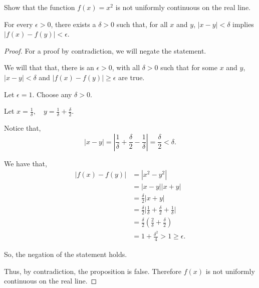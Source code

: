 \documentclass[../hw5.tex]{subfiles}
\begin{document}
Show that the function $f(x)=x^2$ is not uniformly continuous on the real line.

\begin{proposition}
    For every $\epsilon>0$, there exists a $\delta>0$ such that, for all $x$ and $y$, $|x-y|<\delta$ implies $|f(x)-f(y)|<\epsilon$.
\end{proposition}

\begin{proof}
    For a proof by contradiction, we will negate the statement. 

    We will that that, there is an $\epsilon>0$, with all $\delta>0$ such that for some $x$ and $y$, $|x-y|<\delta$ and $|f(x)-f(y)|\geq\epsilon$ are true.

    Let $\epsilon=1$. Choose any $\delta>0$.

    Let $x=\frac{1}{\delta}, \quad y=\frac{1}{\delta}+\frac{\delta}{2}$.

    Notice that,
    \[|x-y|=|\frac{1}{\delta}+\frac{\delta}{2} - \frac{1}{\delta}| = \frac{\delta}{2} < \delta.\]


    We have that,
    \begin{align*}
        |f(x)-f(y)| &= |x^2-y^2| \\
        &= |x-y||x+y| \\
        &= \frac{\delta}{2}|x+y| \\
        &= \frac{\delta}{2}\Bigg| \frac{1}{\delta}+\frac{\delta}{2} + \frac{1}{\delta}\Bigg| \\
        &= \frac{\delta}{2} \left( \frac{2}{\delta}+\frac{\delta}{2} \right) \\
        &= 1 + \frac{\delta^2}{4} > 1\geq\epsilon.
    \end{align*}

    So, the negation of the statement holds.

    Thus, by contradiction, the proposition is false.
    Therefore $f(x)$ is not uniformly continuous on the real line.
    
\end{proof}
\end{document}
